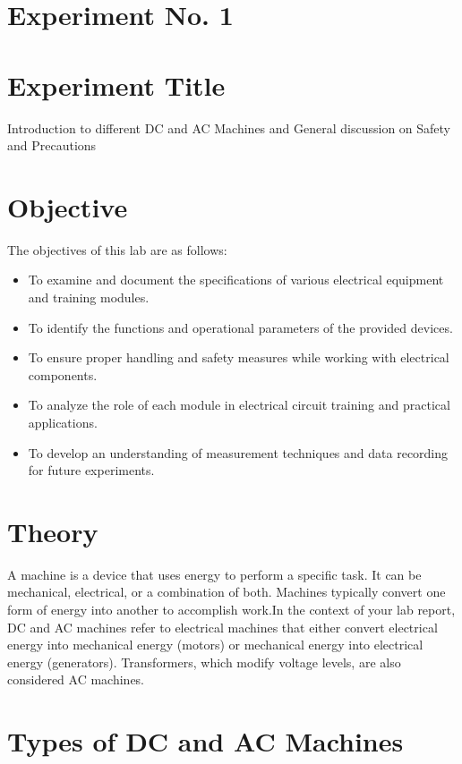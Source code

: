 \documentclass[a4paper,12pt]{article}
\begin{document}
	\section{Experiment No. 1}
	
	\section{Experiment Title }
	
	Introduction to different DC and AC Machines and General discussion on Safety and Precautions
	
	\section{Objective}
	
	The objectives of this lab are as follows:
	\begin{itemize}
    \item To examine and document the specifications of various electrical equipment and training modules.
\item To identify the functions and operational parameters of the provided devices.
\item To ensure proper handling and safety measures while working with electrical components.
\item To analyze the role of each module in electrical circuit training and practical applications.
\item To develop an understanding of measurement techniques and data recording for future experiments.
	\end{itemize}
	
	\section{Theory}
A machine is a device that uses energy to perform a specific task. It can be mechanical, electrical, or a combination of both. Machines typically convert one form of energy into another to accomplish work.In the context of your lab report, DC and AC machines refer to electrical machines that either convert electrical energy into mechanical energy (motors) or mechanical energy into electrical energy (generators). Transformers, which modify voltage levels, are also considered AC machines.
	
	\section{Types of DC and AC Machines}
	
\end{document}
